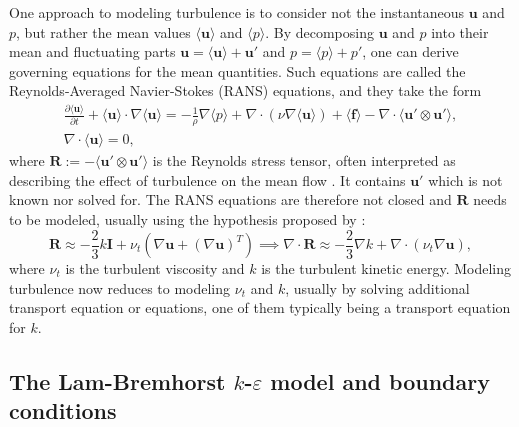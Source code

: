 One approach to modeling turbulence is to consider not the instantaneous \(\mathbf{u}\) and \(p\), but rather the mean values \(\langle \mathbf{u} \rangle\) and \( \langle p \rangle\). By decomposing \(\mathbf{u}\) and \(p\) into their mean and fluctuating parts \(\mathbf{u} = \langle \mathbf{u} \rangle + \mathbf{u}'\) and \(p = \langle p \rangle + p'\), one can derive governing equations for the mean quantities. Such equations are called the Reynolds-Averaged Navier-Stokes (RANS) equations, and they take the form
\begin{equation}\label{eq: RANS}
    \begin{split}
        \frac{\partial \langle \mathbf{u} \rangle}{\partial t} + \langle \mathbf{u} \rangle \cdot \nabla{\langle \mathbf{u} \rangle}
        = 
        -\frac{1}{\rho} \nabla \langle p \rangle + \nabla \cdot (\nu \nabla \langle \mathbf{u} \rangle ) + \langle \mathbf{f} \rangle - \nabla \cdot \langle \mathbf{u}' \otimes \mathbf{u}' \rangle,
        \\
        \nabla \cdot \langle \mathbf{u} \rangle 
        = 0,
    \end{split}
\end{equation}
where \(\mathbf{R} := - \langle \mathbf{u}' \otimes \mathbf{u}' \rangle\) is the Reynolds stress tensor, often interpreted as describing the effect of turbulence on the mean flow \citep{wilcox_turbulence_2006}. It contains \(\mathbf{u}'\) which is not known nor solved for. The RANS equations are therefore not closed and \(\mathbf{R}\) needs to be modeled, usually using the hypothesis proposed by \cite{boussinesq__essai_1877}:
\begin{equation}\label{eq: Boussinesq hypothesis}
    \mathbf{R} 
    \approx 
    - \frac{2}{3}k \mathbf{I} 
    + \nu_t \left(\nabla{\mathbf{u}} 
    + (\nabla{\mathbf{u}})^T\right)
    \implies
    \nabla \cdot \mathbf{R} 
    \approx
    - \frac{2}{3} \nabla k 
    + \nabla \cdot \left( \nu_t \nabla \mathbf{u} \right),
\end{equation}
where \(\nu_t\) is the turbulent viscosity and \(k\) is the turbulent kinetic energy. Modeling turbulence now reduces to modeling \(\nu_t\) and \(k\), usually by solving additional transport equation or equations, one of them typically being a transport equation for \(k\).

\subsection{The Lam-Bremhorst \(k\)-\(\varepsilon\) model and boundary conditions}

